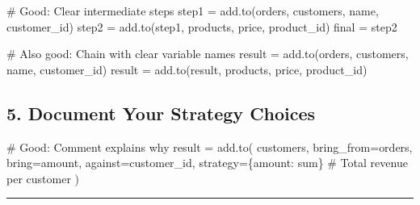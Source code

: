 \documentclass[
  letterpaper,
]{scrbook}
\newenvironment{Shaded}{\begin{snugshade}}{\end{snugshade}}
\newcommand{\CommentTok}[1]{\textcolor[rgb]{0.37,0.37,0.37}{#1}}
\newcommand{\NormalTok}[1]{\textcolor[rgb]{0.00,0.23,0.31}{#1}}
\newcommand{\OperatorTok}[1]{\textcolor[rgb]{0.37,0.37,0.37}{#1}}
\newcommand{\StringTok}[1]{\textcolor[rgb]{0.13,0.47,0.30}{#1}}
\begin{document}
\begin{Shaded}
\begin{Highlighting}[]
\CommentTok{\# Good: Clear intermediate steps}
\NormalTok{step1 }\OperatorTok{=}\NormalTok{ add.to(orders, customers, }\StringTok{\textquotesingle{}name\textquotesingle{}}\NormalTok{, }\StringTok{\textquotesingle{}customer\_id\textquotesingle{}}\NormalTok{)}
\NormalTok{step2 }\OperatorTok{=}\NormalTok{ add.to(step1, products, }\StringTok{\textquotesingle{}price\textquotesingle{}}\NormalTok{, }\StringTok{\textquotesingle{}product\_id\textquotesingle{}}\NormalTok{)}
\NormalTok{final }\OperatorTok{=}\NormalTok{ step2}

\CommentTok{\# Also good: Chain with clear variable names}
\NormalTok{result }\OperatorTok{=}\NormalTok{ add.to(orders, customers, }\StringTok{\textquotesingle{}name\textquotesingle{}}\NormalTok{, }\StringTok{\textquotesingle{}customer\_id\textquotesingle{}}\NormalTok{)}
\NormalTok{result }\OperatorTok{=}\NormalTok{ add.to(result, products, }\StringTok{\textquotesingle{}price\textquotesingle{}}\NormalTok{, }\StringTok{\textquotesingle{}product\_id\textquotesingle{}}\NormalTok{)}
\end{Highlighting}
\end{Shaded}

\subsection{5. Document Your Strategy
Choices}\label{document-your-strategy-choices}

\begin{Shaded}
\begin{Highlighting}[]
\CommentTok{\# Good: Comment explains why}
\NormalTok{result }\OperatorTok{=}\NormalTok{ add.to(}
\NormalTok{    customers,}
\NormalTok{    bring\_from}\OperatorTok{=}\NormalTok{orders,}
\NormalTok{    bring}\OperatorTok{=}\StringTok{\textquotesingle{}amount\textquotesingle{}}\NormalTok{,}
\NormalTok{    against}\OperatorTok{=}\StringTok{\textquotesingle{}customer\_id\textquotesingle{}}\NormalTok{,}
\NormalTok{    strategy}\OperatorTok{=}\NormalTok{\{}\StringTok{\textquotesingle{}amount\textquotesingle{}}\NormalTok{: }\StringTok{\textquotesingle{}sum\textquotesingle{}}\NormalTok{\}  }\CommentTok{\# Total revenue per customer}
\NormalTok{)}
\end{Highlighting}
\end{Shaded}

\begin{center}\rule{0.5\linewidth}{0.5pt}\end{center}
\end{document}

